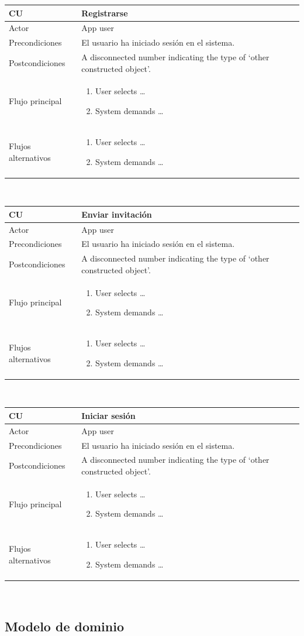 \documentclass[twoside]{report}
\newcommand\addrow[2]{#1 &#2\\ }
\newcommand\addheading[2]{#1 &#2\\ \hline}
\newcommand\tabularhead{\begin{tabular}{lp{0.7\textwidth}}
\hline
}
\newcommand\addmulrow[2]{ \begin{minipage}[t][][t]{2.5cm}#1\end{minipage}%
   &\begin{minipage}[t][][t]{8cm}
    \begin{enumerate} #2   \end{enumerate}
    \end{minipage}\\ }
\newenvironment{usecase}{\tabularhead}
{\hline\end{tabular}}
\begin{document}
\begin{usecase}
  \addheading{\textbf{CU\arabic{usecase}}}{Registrarse} 
  \addrow{Actor}{App user}
  \addrow{Precondiciones}{El usuario ha iniciado sesión en el sistema.}
  \addrow{Postcondiciones}{A disconnected number indicating the type of `other constructed object'.}
  \addmulrow{Flujo principal}{
  		\item User selects \ldots
        \item System demands \ldots
  }
  \addmulrow{Flujos alternativos}{
  		\item User selects \ldots
        \item System demands \ldots
  }
\end{usecase}\\

\begin{usecase}
  \addheading{\textbf{CU\arabic{usecase}}}{Enviar invitación} 
  \addrow{Actor}{App user}
  \addrow{Precondiciones}{El usuario ha iniciado sesión en el sistema.}
  \addrow{Postcondiciones}{A disconnected number indicating the type of `other constructed object'.}
  \addmulrow{Flujo principal}{
  		\item User selects \ldots
        \item System demands \ldots
  }
  \addmulrow{Flujos alternativos}{
  		\item User selects \ldots
        \item System demands \ldots
  }
\end{usecase}\\

\begin{usecase}
  \addheading{\textbf{CU\arabic{usecase}}}{Iniciar sesión} 
  \addrow{Actor}{App user}
  \addrow{Precondiciones}{El usuario ha iniciado sesión en el sistema.}
  \addrow{Postcondiciones}{A disconnected number indicating the type of `other constructed object'.}
  \addmulrow{Flujo principal}{
  		\item User selects \ldots
        \item System demands \ldots
  }
  \addmulrow{Flujos alternativos}{
  		\item User selects \ldots
        \item System demands \ldots
  }
\end{usecase}\\

\subsection{Modelo de dominio}
\end{document}
